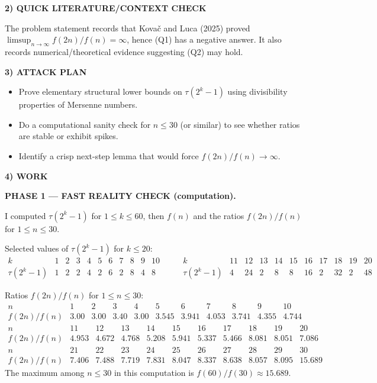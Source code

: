 \medskip
\noindent\textbf{2) QUICK LITERATURE/CONTEXT CHECK}

The problem statement records that Kova\v{c} and Luca (2025) proved
$\limsup_{n\to\infty} f(2n)/f(n)=\infty$, hence (Q1) has a negative answer.
It also records numerical/theoretical evidence suggesting (Q2) may hold.

\medskip
\noindent\textbf{3) ATTACK PLAN}

\begin{itemize}
\item Prove elementary structural lower bounds on $\tau(2^k-1)$ using divisibility
properties of Mersenne numbers.
\item Do a computational sanity check for $n\le 30$ (or similar) to see whether
ratios are stable or exhibit spikes.
\item Identify a crisp next-step lemma that would force $f(2n)/f(n)\to\infty$.
\end{itemize}

\medskip
\noindent\textbf{4) WORK}

\textbf{PHASE 1 — FAST REALITY CHECK (computation).}

I computed $\tau(2^k-1)$ for $1\le k\le 60$, then $f(n)$ and the ratios
$f(2n)/f(n)$ for $1\le n\le 30$.

Selected values of $\tau(2^k-1)$ for $k\le 20$:
\[
\begin{array}{c|cccccccccc}
 k &1&2&3&4&5&6&7&8&9&10\\\hline
 \tau(2^k-1) &1&2&2&4&2&6&2&8&4&8
\end{array}
\qquad
\begin{array}{c|cccccccccc}
 k &11&12&13&14&15&16&17&18&19&20\\\hline
 \tau(2^k-1) &4&24&2&8&8&16&2&32&2&48
\end{array}
\]

Ratios $f(2n)/f(n)$ for $1\le n\le 30$:
\[
\begin{array}{c|cccccccccc}
 n&1&2&3&4&5&6&7&8&9&10\\\hline
 f(2n)/f(n)&3.00&3.00&3.40&3.00&3.545&3.941&4.053&3.741&4.355&4.744
\end{array}
\]
\[
\begin{array}{c|cccccccccc}
 n&11&12&13&14&15&16&17&18&19&20\\\hline
 f(2n)/f(n)&4.953&4.672&4.768&5.208&5.941&5.337&5.466&8.081&8.051&7.086
\end{array}
\]
\[
\begin{array}{c|cccccccccc}
 n&21&22&23&24&25&26&27&28&29&30\\\hline
 f(2n)/f(n)&7.406&7.488&7.719&7.831&8.047&8.337&8.638&8.057&8.095&15.689
\end{array}
\]
The maximum among $n\le 30$ in this computation is $f(60)/f(30)\approx 15.689$.

